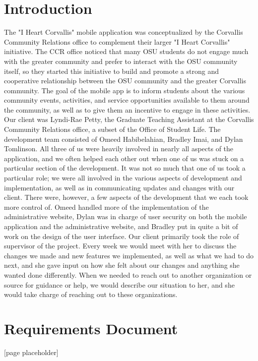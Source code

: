 \documentclass[onecolumn, draftclsnofoot,10pt, compsoc]{IEEEtran}
\begin{document}
\section{Introduction}
  The "I Heart Corvallis" mobile application was conceptualized by the Corvallis Community Relations office to complement their larger "I Heart Corvallis" initiative. The CCR office noticed that many OSU students do not engage much with the greater community and prefer to interact with the OSU community itself, so they started this initiative to build and promote a strong and cooperative relationship between the OSU community and the greater Corvallis community. The goal of the mobile app is to inform students about the various community events, activities, and service opportunities available to them around the community, as well as to give them an incentive to engage in these activities.
  Our client was Lyndi-Rae Petty, the Graduate Teaching Assistant at the Corvallis Community Relations office, a subset of the Office of Student Life. The development team consisted of Omeed Habibelahian, Bradley Imai, and Dylan Tomlinson. All three of us were heavily involved in nearly all aspects of the application, and we often helped each other out when one of us was stuck on a particular section of the development. It was not so much that one of us took a particular role; we were all involved in the various aspects of development and implementation, as well as in communicating updates and changes with our client. There were, however, a few aspects of the development that we each took more control of. Omeed handled more of the implementation of the administrative website, Dylan was in charge of user security on both the mobile application and the administrative website, and Bradley put in quite a bit of work on the design of the user interface.
  Our client primarily took the role of supervisor of the project. Every week we would meet with her to discuss the changes we made and new features we implemented, as well as what we had to do next, and she gave input on how she felt about our changes and anything she wanted done differently. When we needed to reach out to another organization or source for guidance or help, we would describe our situation to her, and she would take charge of reaching out to these organizations.

\section{Requirements Document}
  [page placeholder]\newpage
\end{document}
